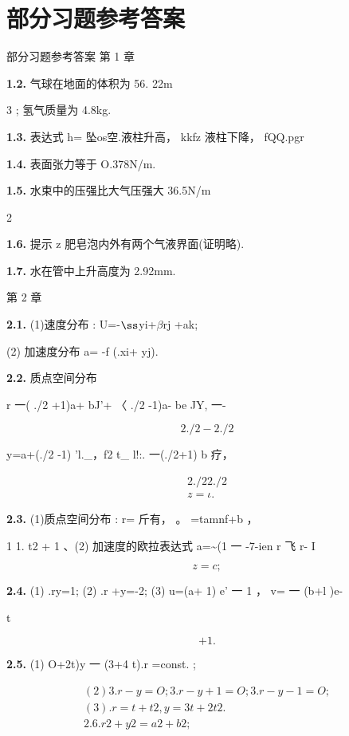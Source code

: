 \chapter*{部分习题参考答案}
部分习题参考答案 第 1 章

\noindent\textbf{1.2.} 气球在地面的体积为 56. 22m

3 ; 氢气质量为 4.8kg.

\noindent\textbf{1.3.} 表达式 h= 坠os空.液柱升高， kkfz 液柱下降， fQQ.pgr

\noindent\textbf{1.4.} 表面张力等于 O.378N/m.

\noindent\textbf{1.5.} 水束中的压强比大气压强大 36.5N/m

2

\noindent\textbf{1.6.} 提示 z 肥皂泡内外有两个气液界面(证明略).

\noindent\textbf{1.7.} 水在管中上升高度为 2.92mm.

第 2 章

\noindent\textbf{2.1.} (1)速度分布 : U=-${\rm ß}$yi+$\beta$rj +ak;

(2) 加速度分布 a= -f (.xi+ yj).

\noindent\textbf{2.2.} 质点空间分布

r 一( ./2 +1)a+ bJ'+ 〈 ./2 -1)a- be JY, 一-

\[2./2 - 2./2\]

y=a+(./2 -1) 'l.\_，f2 t\_ l!:. 一(./2+1) b 疗，

\begin{gather*}
2./2 2./2\\
z= \iota .
\end{gather*}

\noindent\textbf{2.3.} (1)质点空间分布 : r= 斤有， 。 =tamnf+b ，

1 1. t2 + 1 、(2) 加速度的欧拉表达式 a=\textasciitilde{}(1 一 -7-ien r 飞 r- I

\[z=c;\]

\noindent\textbf{2.4.} (1) .ry=1; (2) .r +y=-2; (3) u=(a+ 1) e' 一 1 ， v= 一 (b+l )e-

t

\[+1.\]

\noindent\textbf{2.5.} (1) O+2t)y 一 (3+4 t).r =const. ;

\begin{gather*}
(2) 3.r -y=O; 3.r -y+1=O; 3.r -y-1=O;\\
(3) .r =t+t 2, y=3t+2t 2.\\
2.6 .r2+y2=a 2+b2;
\end{gather*}

